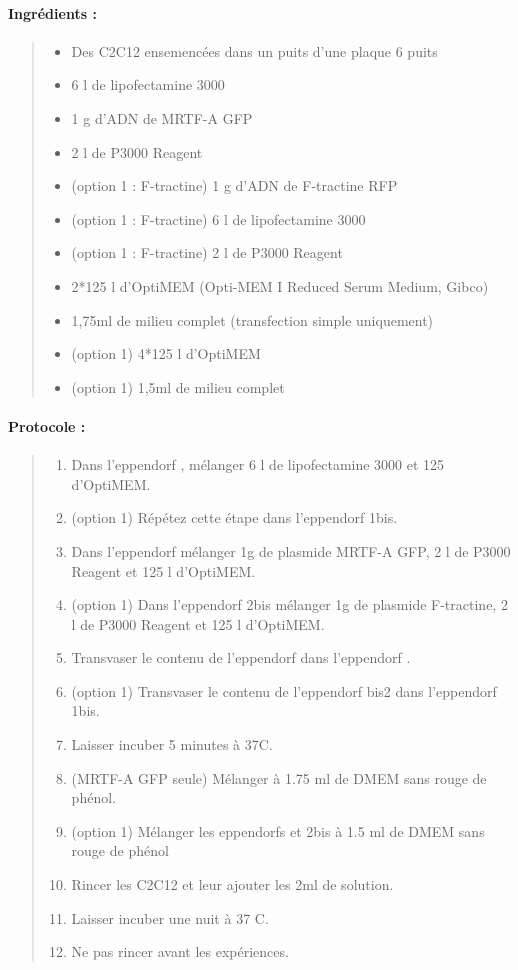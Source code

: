 \paragraph{Ingrédients :}
\begin{quote}

	\begin{itemize}
	\item Des C2C12 ensemencées dans un puits d'une plaque 6 puits
	\item 6 \micro l de lipofectamine 3000 
	\item 1 \micro g d'ADN de MRTF-A GFP
	\item 2 \micro l de P3000 Reagent
	\item (option 1 : F-tractine) 1 \micro g d'ADN de F-tractine RFP
	\item (option 1 : F-tractine) 6 \micro l de lipofectamine 3000
	\item (option 1 : F-tractine) 2 \micro l de P3000 Reagent
	\item 2*125 \micro l d'OptiMEM (Opti-MEM I Reduced Serum Medium, Gibco)
	\item 1,75ml de milieu complet (transfection simple uniquement)
	\item (option 1) 4*125 \micro l d'OptiMEM
	\item (option 1) 1,5ml de milieu complet 
	\end{itemize}
\end{quote}
\paragraph{Protocole : }
\begin{quote}
\begin{enumerate}
	\item Dans l'eppendorf , mélanger 6 \micro l de lipofectamine 3000 et 125 \micro d'OptiMEM. 
	\item (option 1) Répétez cette étape dans l'eppendorf \no 1bis. 
	\item Dans l'eppendorf  mélanger 1\micro g de plasmide MRTF-A GFP, 2 \micro l de P3000 Reagent et 125 \micro l d'OptiMEM.
	\item (option 1) Dans l'eppendorf \no 2bis mélanger 1\micro g de plasmide F-tractine, 2 \micro l de P3000 Reagent et 125 \micro l d'OptiMEM.
	\item Transvaser le contenu de l'eppendorf  dans l'eppendorf . 
	\item (option 1) Transvaser le contenu de l'eppendorf \no bis2 dans l'eppendorf \no 1bis. 
	\item Laisser incuber 5 minutes à 37\degres C. 
	\item (MRTF-A GFP seule) Mélanger à 1.75 ml de DMEM sans rouge de phénol.
	\item (option 1) Mélanger les eppendorfs  et \no 2bis à 1.5 ml de DMEM sans rouge de phénol
	\item Rincer les C2C12 et leur ajouter les 2ml de solution. 
	\item Laisser incuber une nuit à 37 \degres C.
	\item Ne pas rincer avant les expériences.
\end{enumerate}
\end{quote}

